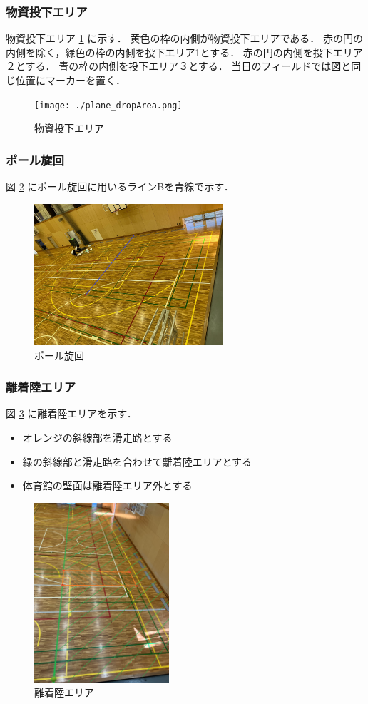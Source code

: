 \subsubsection{物資投下エリア}
物資投下エリア \ref{fig::plane::dropArea} に示す．
黄色の枠の内側が物資投下エリアである．
赤の円の内側を除く，緑色の枠の内側を投下エリア1とする．
赤の円の内側を投下エリア２とする．
青の枠の内側を投下エリア３とする．
当日のフィールドでは図と同じ位置にマーカーを置く．

\begin{figure}[bh]
  \centering\texttt{[image: ./plane\_dropArea.png]}
  \caption{物資投下エリア}
  \label{fig::plane::dropArea}
\end{figure}

\subsubsection{ポール旋回}
図 \ref{fig::plane::poleTurn} にポール旋回に用いるラインBを青線で示す．
\begin{figure}[h]
  \centering\includegraphics[width=70mm]{plane_poleTurn.jpg}
  \caption{ポール旋回}
  \label{fig::plane::poleTurn}
\end{figure}

\subsubsection{離着陸エリア}
図 \ref{fig::plane::landingZone} に離着陸エリアを示す．
\begin{itemize}
  \item オレンジの斜線部を滑走路とする
  \item 緑の斜線部と滑走路を合わせて離着陸エリアとする
  \item 体育館の壁面は離着陸エリア外とする
\end{itemize}
\begin{figure}[htb]
  \centering\includegraphics[width = 50mm,angle=90]{./plane_landingZone.jpg}
  \caption{離着陸エリア}
  \label{fig::plane::landingZone}
\end{figure}
\newpage